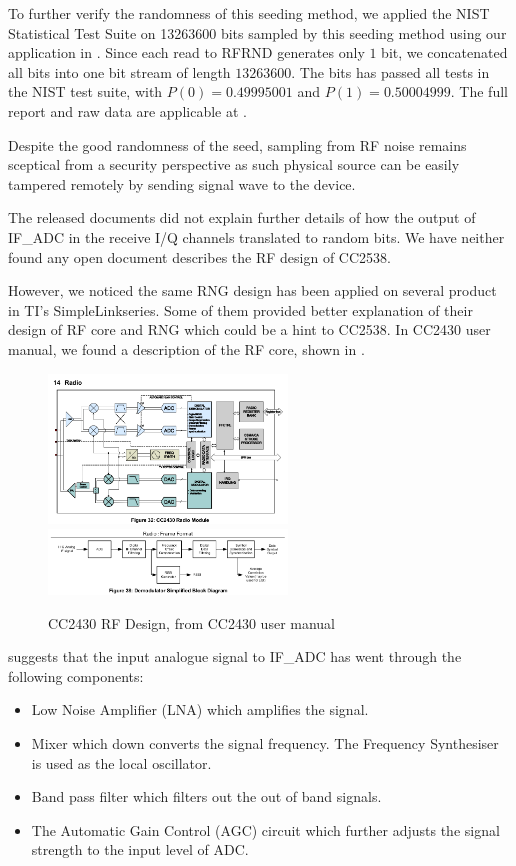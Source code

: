 To further verify the randomness of this seeding method, we applied the NIST Statistical Test Suite\cite{NISTTest} on 13263600 bits sampled by this seeding method using our application in \cite{prngtest}. Since each read to RFRND generates only $1$ bit, we concatenated all bits into one bit stream of length $13263600$. The bits has passed all tests in the NIST test suite, with $P(0) = 0.49995001$ and $P(1) = 0.50004999$. The full report and raw data are applicable at \cite{prngtest}.

Despite the good randomness of the seed, sampling from RF noise remains sceptical from a security perspective as such physical source can be easily tampered remotely by sending signal wave to the device.

The released documents did not explain further details of how the output of IF\_ADC in the receive I/Q channels translated to random bits. We have neither found any open document describes  the RF design of CC2538. 

However, we noticed the same RNG design has been applied on several product in TI's SimpleLink\texttrademark series. Some of them provided better explanation of their design of RF core and RNG which could be a hint to CC2538. In CC2430 user manual\cite{CC2430Manual}, we found a description of the RF core, shown in .

\begin{figure}[!t]
\centering
\includegraphics[width=2.5in]{fig/CC2430_Radio.png}
\includegraphics[width=2.5in]{fig/CC2430_Demodulator.png}
\caption{CC2430 RF Design, from CC2430 user manual\cite{CC2430Manual}}
\label{CC2430RF}
\end{figure}

 suggests that the input analogue signal to IF\_ADC has went through the following components:
\begin{itemize}
	\item Low Noise Amplifier (LNA) which amplifies the signal.
	\item Mixer which down converts the signal frequency. The Frequency Synthesiser is used as the local oscillator.
	\item Band pass filter which filters out the out of band signals.
	\item The Automatic Gain Control (AGC) circuit which further adjusts the signal strength to the input level of ADC.
\end{itemize}


